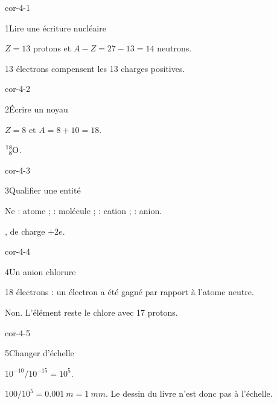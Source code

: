 \clearpage{}
\corrigesSouples
\begin{blocLivre}{cor-4-1}\begin{corrige}{1}{Lire une écriture nucléaire}
\begin{questions}
\item $Z=13$ protons et $A-Z=27-13=14$ neutrons.
\item 13 électrons compensent les 13 charges positives.
\end{questions}
\end{corrige}\end{blocLivre}
\begin{blocLivre}{cor-4-2}\begin{corrige}{2}{Écrire un noyau}
\begin{questions}
\item $Z=8$ et $A=8+10=18$.
\item $\ce{^{18}_{8}O}$.
\end{questions}
\end{corrige}\end{blocLivre}
\begin{blocLivre}{cor-4-3}\begin{corrige}{3}{Qualifier une entité}
\begin{questions}
\item Ne : atome ;  : molécule ;  : cation ;  : anion.
\item {}, de charge $+2e$.
\end{questions}
\end{corrige}\end{blocLivre}
\begin{blocLivre}{cor-4-4}\begin{corrige}{4}{Un anion chlorure}
\begin{questions}
\item 18 électrons : un électron a été gagné par rapport à l’atome neutre.
\item Non. L’élément reste le chlore avec 17 protons.
\end{questions}
\end{corrige}\end{blocLivre}
\begin{blocLivre}{cor-4-5}\begin{corrige}{5}{Changer d’échelle}
\begin{questions}
\item $10^{-10}/10^{-15}=10^5$.
\item $100/10^5=\qty{0,001}{m}=\qty{1}{mm}$. Le dessin du livre n’est donc pas à l’échelle.
\end{questions}
\end{corrige}\end{blocLivre}
